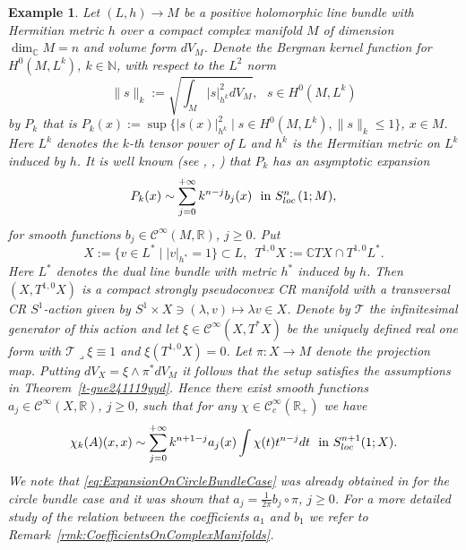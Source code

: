 \documentclass[12pt]{amsart}
\newtheorem{example}[theorem]{Example}
\theoremstyle{definition}
\theoremstyle{named}
\numberwithin{equation}{subsection}
\newcommand{\R}{\mathbb{R}}
\newcommand{\C}{\mathbb{C}}
\newcommand{\N}{\mathbb{N}}
\def\cC{\mathscr{C}}
\begin{document}
\begin{example}\label{Ex:RelationToBKExpansion}
	Let \((L,h)\to M\) be a positive holomorphic line bundle with Hermitian metric \(h\) over a compact complex manifold \(M\) of dimension \(\dim_\C M=n\) and volume form \(dV_M\). Denote the Bergman kernel function for \(H^0(M,L^k)\), \(k\in \N\), with respect to the \(L^2\) norm
	\[\|s\|_k:=\sqrt{\int_{M}|s|^2_{h^k}dV_M},\,\,\,\, s\in H^0(M,L^k)\]
	 by \(P_k\) that is \(P_k(x):=\sup\{|s(x)|^2_{h^k}\mid s\in H^0(M,L^k), \|s\|_k\leq1\}\), \(x\in M\). Here \(L^k\) denotes the \(k\)-th tensor power of \(L\) and \(h^k\) is the Hermitian metric on \(L^k\) induced by \(h\). It is well known (see \cite{Catlin_BKE_1999}, \cite{Ma_Marinescu_HMI_BKE_2007}, \cite{Zelditch_BKE_1998}) that \(P_k\) has an asymptotic expansion
	\[P_k(x)\sim\sum^{+\infty}_{j=0}k^{n-j}b_j(x)\ \ \mbox{in $S^{n}_{{\rm loc\,}}(1;M)$},\]
	for smooth functions \(b_j\in\cC^\infty(M,\R)\), \(j\geq 0\).
	Put
	\[X:=\{v\in L^*\mid |v|_{h^*}=1\} \subset L,\,\,\,T^{1,0}X:=\C TX\cap T^{1,0}L^*.\]
	Here \(L^*\) denotes the dual line bundle with metric \(h^*\) induced by \(h\). Then \((X,T^{1,0}X)\) is a compact strongly pseudoconvex CR manifold with a transversal CR \(S^1\)-action given by \(S^1\times X\ni(\lambda,v)\mapsto \lambda v \in X\). Denote by \(\mathcal{T}\) the infinitesimal generator of this action and let \(\xi\in \cC^\infty(X,T^*X)\) be the uniquely defined real one form with \(\mathcal{T}\lrcorner\xi\equiv1\) and \(\xi(T^{1,0}X)=0\). Let \(\pi\colon X\to M\) denote the projection map. Putting \(dV_X=\xi\wedge\pi^*dV_M\) it follows that the setup satisfies the assumptions in Theorem~\ref{t-gue241119yyd}. Hence there exist smooth functions \(a_j\in\cC^\infty(X,\R)\), \(j\geq 0\), such that for any \(\chi\in \cC_c^\infty(\R_+)\) we have
	\begin{eqnarray}\label{eq:ExpansionOnCircleBundleCase}
		\chi_k(A)(x,x)\sim\sum^{+\infty}_{j=0}k^{n+1-j}a_j(x)\int\chi(t)t^{n-j}dt\ \ \mbox{in $S^{n+1}_{{\rm loc\,}}(1;X)$}.
	\end{eqnarray}
	We note that \eqref{eq:ExpansionOnCircleBundleCase} was already obtained in \cite{HHMS23} for the circle bundle case and it was shown  that \(a_j=\frac{1}{2\pi}b_j\circ \pi\), \(j\geq 0\). For a more detailed  study of the relation between the coefficients \(a_1\) and \(b_1\) we refer to Remark~\ref{rmk:CoefficientsOnComplexManifolds}.  
\end{example}


 
 
\end{document}
